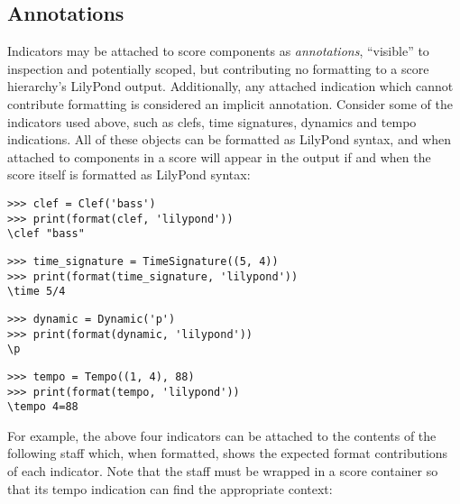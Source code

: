\subsection{Annotations}
\label{ssec:annotations}

Indicators may be attached to score components as \emph{annotations},
\enquote{visible} to inspection and potentially scoped, but contributing no
formatting to a score hierarchy's LilyPond output. Additionally, any attached
indication which cannot contribute formatting is considered an implicit
annotation. Consider some of the indicators used above, such as clefs, time
signatures, dynamics and tempo indications. All of these objects can be
formatted as LilyPond syntax, and when attached to components in a score will
appear in the output if and when the score itself is formatted as LilyPond
syntax:

\begin{comment}
<abjad>
clef = Clef('bass')
print(format(clef, 'lilypond'))
time_signature = TimeSignature((5, 4))
print(format(time_signature, 'lilypond'))
dynamic = Dynamic('p')
print(format(dynamic, 'lilypond'))
tempo = Tempo((1, 4), 88)
print(format(tempo, 'lilypond'))
</abjad>
\end{comment}

\begin{abjadbookoutput}
\begin{singlespacing}
\vspace{-0.5\baselineskip}
\begin{verbatim}
>>> clef = Clef('bass')
>>> print(format(clef, 'lilypond'))
\clef "bass"
\end{verbatim}
\begin{verbatim}
>>> time_signature = TimeSignature((5, 4))
>>> print(format(time_signature, 'lilypond'))
\time 5/4
\end{verbatim}
\begin{verbatim}
>>> dynamic = Dynamic('p')
>>> print(format(dynamic, 'lilypond'))
\p
\end{verbatim}
\begin{verbatim}
>>> tempo = Tempo((1, 4), 88)
>>> print(format(tempo, 'lilypond'))
\tempo 4=88
\end{verbatim}
\end{singlespacing}
\end{abjadbookoutput}

\noindent For example, the above four indicators can be attached to the
contents of the following staff which, when formatted, shows the expected
format contributions of each indicator. Note that the staff must be wrapped in
a score container so that its tempo indication can find the appropriate
context:

